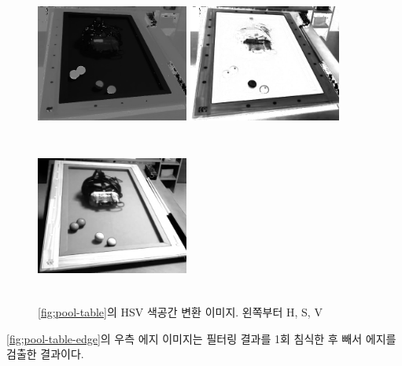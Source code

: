 \documentclass[11pt]{oblivoir}
\begin{document}
\begin{figure}[ht]
        \begin{center}
                \includegraphics[width=5cm, height=5cm, keepaspectratio]{img/billiards-table-h-shift.png}
                \includegraphics[width=5cm, height=5cm, keepaspectratio]{img/billiards-table-s.png}
                \includegraphics[width=5cm, height=5cm, keepaspectratio]{img/billiards-table-v.png}
        \end{center}
        \caption[Caption for LOF]{\cref{fig;pool-table}의 HSV 색공간 변환 이미지. 왼쪽부터 H\footnotemark, S, V}
        \label{fig;pool-table-hs}
\end{figure}

\cref{fig;pool-table-edge}의 우측 에지 이미지는 필터링 결과를 1회 침식한 후 빼서 에지를 검출한 결과이다.
\end{document}
